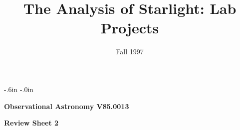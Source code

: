  
\topmargin -.6in 
\textheight 8.7in 
\oddsidemargin -.0in 
\textwidth 6.5in 
\title{The Analysis of Starlight: Lab Projects} 
\date{Fall 1997} 
 
\setcounter{page}{1} 
\setcounter{equation}{0} 
\pagestyle{empty} 
\parindent 0pt 
\parskip 8pt 
\def\arcsec{\ifmmode {^{\scriptscriptstyle\prime\prime}}
          \else $^{\scriptscriptstyle\prime\prime}$\fi}
\def\arcmin{\ifmmode {^{\scriptscriptstyle\prime}}
          \else $^{\scriptscriptstyle\prime}$\fi}
\def\deg{\ifmmode^\circ\else$^\circ$\fi}


   
 
\noindent 
{\bf Observational Astronomy      \hfill  V85.0013}\\ 
 
\bigskip 
 
\noindent 
{\hfill \Large {\bf Review Sheet 2} \hfill} 
  

